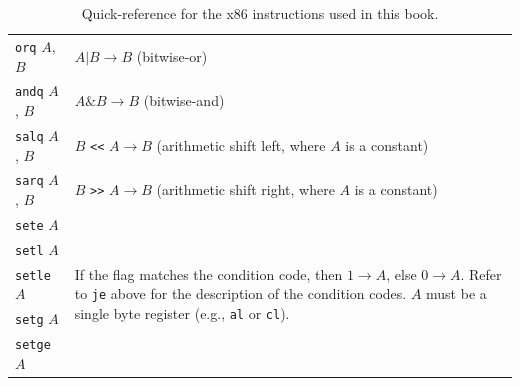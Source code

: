 \documentclass[11pt]{book}
\begin{document}
\begin{table}[tbp]
\begin{tabular}{l|l}
\texttt{orq} $A$, $B$ & $A | B \to B$ \qquad (bitwise-or)\\
\texttt{andq} $A$, $B$ & $A \& B \to B$ \qquad (bitwise-and)\\
\texttt{salq} $A$, $B$ & $B$ \texttt{<<} $A \to B$ (arithmetic shift left, where $A$ is a constant)\\
\texttt{sarq} $A$, $B$ & $B$ \texttt{>>} $A \to B$ (arithmetic shift right, where $A$ is a constant)\\
\texttt{sete} $A$ & \multirow{5}{3.7in}{If the flag matches the condition code,
   then $1 \to A$, else $0 \to A$. Refer to \texttt{je} above for the
   description of the condition codes. $A$ must be a single byte register
   (e.g., \texttt{al} or \texttt{cl}).} \\
\texttt{setl} $A$ & \\
\texttt{setle} $A$ & \\
\texttt{setg} $A$ & \\
\texttt{setge} $A$ &
\end{tabular}
\vspace{5pt}
  \caption{Quick-reference for the x86 instructions used in this book.}
  \label{tab:x86-instr}
\end{table}

\cleardoublepage

\printindex

\cleardoublepage



\end{document}
